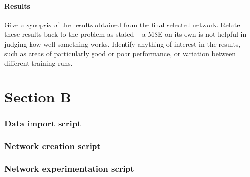 \documentclass[a4paper, 11pt]{article}
\begin{document}
\subsection*{Results}
Give a synopsis of the results obtained from the final selected network.
Relate these results back to the problem as stated – a MSE on its own
is not helpful in judging how well something works.
Identify anything of interest in the results, such as areas of particularly
good or poor performance, or variation between different training runs.






\part*{Section B}








\pagebreak
\appendix
\appendixpage





\section*{Data import script}


\pagebreak

\section*{Network creation script}


\pagebreak

\section*{Network experimentation script}

\end{document}
